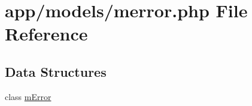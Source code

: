 \hypertarget{merror_8php}{}\section{app/models/merror.php File Reference}
\label{merror_8php}
\subsection*{Data Structures}
\begin{DoxyCompactItemize}
\item 
class \hyperlink{classmError}{m\+Error}
\end{DoxyCompactItemize}
